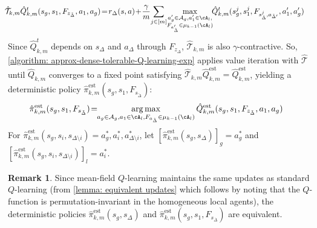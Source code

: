\documentclass{article}
\theoremstyle{plain}
\theoremstyle{definition}
\newtheorem{remark}[theorem]{Remark}
\def\est{\mathrm{est}}
\begin{document}
\begin{align}
\label{equation: empirical_adapted_bellman}
&\!\!\!\hat{\mathcal{T}}_{k,m}\hat{Q}_{k,m}^t(s_g, s_1, F_{z_{\tilde{\Delta}}}, a_1, a_g) 
\!=\!r_\Delta(s, a) \!+\!  \frac{\gamma}{m}\!\sum_{j \in [m]}\! 
\max_{\substack{
a_g' \in \mathcal{A}_g,
a_1' \in \cA_l, \\
F_{a_{\tilde{\Delta}}'} \in \mu_{k-1}(\cA_l)
}}\!\!
\hat{Q}_{k,m}^t(s_g^j, s_1^j, F_{s_{\tilde{\Delta}}^j, a_{\tilde{\Delta}'}}, a_1', a_g')
\end{align}
Since $\hat{Q}_{k,m}^t$ depends on $s_\Delta$ and $a_\Delta$ through $F_{z_\Delta}$, $\hat{\mathcal{T}}_{k,m}$ is also $\gamma$-contractive. So, \cref{algorithm: approx-dense-tolerable-Q-learning-exp} applies value iteration with $\hat{\mathcal{T}}$  until $\hat{Q}_{k,m}$ converges to a fixed point satisfying $\hat{\mathcal{T}}_{k,m}\hat{Q}_{k,m}^\est=\hat{Q}_{k,m}^\est$, yielding a deterministic policy $\hat{\pi}^\est_{k,m}(s_g,s_1,F_{s_{\tilde{\Delta}}})$:
\begin{align*}\hat{\pi}^\est_{k,m}(s_g,s_1,F_{s_{\tilde{\Delta}}}) &\!=\!\!\mathop{\arg\max}_{\substack{a_g\in\mathcal{A}_g,a_1\in\cA_l, F_{a_{\tilde{\Delta}}}\in \mu_{k-1}(\cA_l)}}\hat{Q}^\est_{k,m}(s_g,s_1,F_{z_{\tilde{\Delta}}},a_1,a_g)\end{align*}
For $\hat{\pi}_{k,m}^\est(s_g,s_i,s_{\Delta\setminus i})\!=\!a_g^*,a_i^*,a_{\Delta\setminus i}^*$, let $[\hat{\pi}_{k,m}^\mathrm{est}(s_g,s_\Delta)]_g\!=\!a_g^*$ and $[\hat{\pi}_{k,m}^\mathrm{est}(s_g,s_i,s_{\Delta\setminus i})]_l\!=\!a_i^*$. 

\begin{remark}
    Since mean-field $Q$-learning maintains the same updates as standard $Q$-learning (from \cref{lemma: equivalent updates} which follows by noting that the $Q$-function is permutation-invariant in the homogeneous local agents), the deterministic policies $\hat{\pi}_{k,m}^\est(s_g,s_{\Delta})$ and $\hat{\pi}_{k,m}^\est(s_g,s_1,F_{s_{\bar{\Delta}}})$ are equivalent. 
\end{remark}
\end{document}
